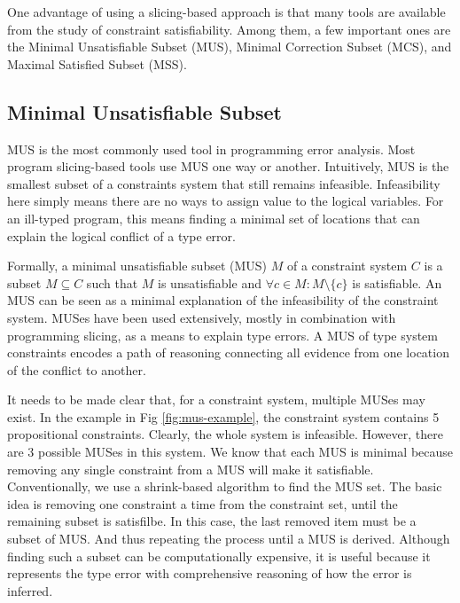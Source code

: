 One advantage of using a slicing-based approach is that many tools are available from the study of constraint satisfiability. Among them, a few important ones are the Minimal Unsatisfiable Subset (MUS), Minimal Correction Subset (MCS), and Maximal Satisfied Subset (MSS).  

\subsection{Minimal Unsatisfiable Subset}

MUS is the most commonly used tool in programming error analysis. Most program slicing-based tools \cite{Haack2004-fr, Pavlinovic2015-ke, Stuckey2003-pz} use MUS one way or another. Intuitively, MUS is the smallest subset of a constraints system that still remains infeasible. Infeasibility here simply means there are no ways to assign value to the logical variables. For an ill-typed program, this means finding a minimal set of locations that can explain the logical conflict of a type error. 

Formally,  a minimal unsatisfiable subset (MUS) $M$ of a constraint system $C$ is a subset $M \subseteq C$ such that $M$ is unsatisfiable and $ \forall{c} \in M : M \setminus \{c\}$ is satisfiable. An MUS can be seen as a minimal explanation of the infeasibility of the constraint system. MUSes have been used extensively, mostly in combination with programming slicing, as a means to explain type errors. A MUS of type system constraints encodes a path of reasoning connecting all evidence from one location of the conflict to another.


It needs to be made clear that, for a constraint system, multiple MUSes may exist. In the example in Fig \ref{fig:mus-example}, the constraint system contains 5 propositional constraints. Clearly, the whole system is infeasible. However, there are 3 possible MUSes in this system. We know that each MUS is minimal because removing any single constraint from a MUS will make it satisfiable. Conventionally, we use a shrink-based algorithm to find the MUS set. The basic idea is removing one constraint a time from the constraint set, until the remaining subset is satisfilbe. In this case, the last removed item must be a subset of MUS. And thus repeating the process until a MUS is derived. Although finding such a subset can be computationally expensive, it is useful because it represents the type error with comprehensive reasoning of how the error is inferred.



